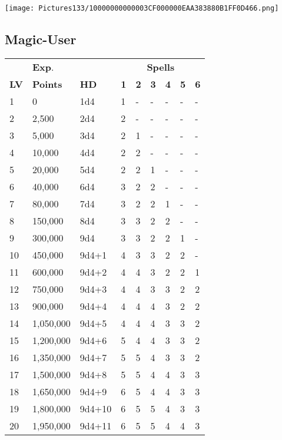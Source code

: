 \documentclass[a4paper,twoside,openany,10pt]{book}
\begin{document}
\begin{multicols}{2}
\addvspace{0.8cm}

\texttt{[image: Pictures133/10000000000003CF000000EAA383880B1FF0D466.png]}


\subsection{Magic-User}\label{magic-user}

\begin{tabular*}{0.93\linewidth}{@{\extracolsep{\fill}}lllllllll}
& \textbf{Exp}. & & \multicolumn{6}{c}{\textbf{Spells}} \\
\textbf{LV} & \textbf{Points} & \textbf{HD} & \textbf{1} & \textbf{2} & \textbf{3} & \textbf{4} & \textbf{5} & \textbf{6} \\\toprule
1 & 0 & 1d4 & 1 & - & - & - & - & - \\\hline
2 & 2,500 & 2d4 & 2 & - & - & - & - & - \\\hline
3 & 5,000 & 3d4 & 2 & 1 & - & - & - & - \\\hline
4 & 10,000 & 4d4 & 2 & 2 & - & - & - & - \\\hline
5 & 20,000 & 5d4 & 2 & 2 & 1 & - & - & - \\\hline
6 & 40,000 & 6d4 & 3 & 2 & 2 & - & - & - \\\hline
7 & 80,000 & 7d4 & 3 & 2 & 2 & 1 & - & - \\\hline
8 & 150,000 & 8d4 & 3 & 3 & 2 & 2 & - & - \\\hline
9 & 300,000 & 9d4 & 3 & 3 & 2 & 2 & 1 & - \\\hline
10 & 450,000 & 9d4+1 & 4 & 3 & 3 & 2 & 2 & - \\\hline
11 & 600,000 & 9d4+2 & 4 & 4 & 3 & 2 & 2 & 1 \\\hline
12 & 750,000 & 9d4+3 & 4 & 4 & 3 & 3 & 2 & 2 \\\hline
13 & 900,000 & 9d4+4 & 4 & 4 & 4 & 3 & 2 & 2 \\\hline
14 & 1,050,000 & 9d4+5 & 4 & 4 & 4 & 3 & 3 & 2 \\\hline
15 & 1,200,000 & 9d4+6 & 5 & 4 & 4 & 3 & 3 & 2 \\\hline
16 & 1,350,000 & 9d4+7 & 5 & 5 & 4 & 3 & 3 & 2 \\\hline
17 & 1,500,000 & 9d4+8 & 5 & 5 & 4 & 4 & 3 & 3 \\\hline
18 & 1,650,000 & 9d4+9 & 6 & 5 & 4 & 4 & 3 & 3 \\\hline
19 & 1,800,000 & 9d4+10 & 6 & 5 & 5 & 4 & 3 & 3 \\\hline
20 & 1,950,000 & 9d4+11 & 6 & 5 & 5 & 4 & 4 & 3 \\\bottomrule
\end{tabular*}\medskip


\end{multicols}
\end{document}
